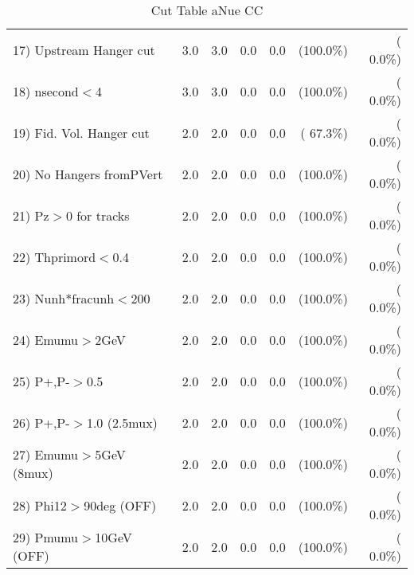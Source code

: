 \begin{table}[h!]
\begin{tabular}{||l||r|r|r|r|r|r||}
 17) Upstream Hanger cut  &          3.0 &          3.0 &          0.0 &          0.0 & (100.0\%) & (  0.0\%) \\
 18) nsecond$<$4          &          3.0 &          3.0 &          0.0 &          0.0 & (100.0\%) & (  0.0\%) \\
 19) Fid. Vol. Hanger cut &          2.0 &          2.0 &          0.0 &          0.0 & ( 67.3\%) & (  0.0\%) \\
 20) No Hangers fromPVert &          2.0 &          2.0 &          0.0 &          0.0 & (100.0\%) & (  0.0\%) \\
 21) Pz$>$0 for tracks    &          2.0 &          2.0 &          0.0 &          0.0 & (100.0\%) & (  0.0\%) \\
 22) Thprimord$<$0.4      &          2.0 &          2.0 &          0.0 &          0.0 & (100.0\%) & (  0.0\%) \\
 23) Nunh*fracunh$<$200   &          2.0 &          2.0 &          0.0 &          0.0 & (100.0\%) & (  0.0\%) \\
 24) Emumu$>$2GeV         &          2.0 &          2.0 &          0.0 &          0.0 & (100.0\%) & (  0.0\%) \\
 25) P+,P-$>$0.5          &          2.0 &          2.0 &          0.0 &          0.0 & (100.0\%) & (  0.0\%) \\
 26) P+,P-$>$1.0 (2.5mux) &          2.0 &          2.0 &          0.0 &          0.0 & (100.0\%) & (  0.0\%) \\
 27) Emumu$>$5GeV  (8mux) &          2.0 &          2.0 &          0.0 &          0.0 & (100.0\%) & (  0.0\%) \\
 28) Phi12$>$90deg  (OFF) &          2.0 &          2.0 &          0.0 &          0.0 & (100.0\%) & (  0.0\%) \\
 29) Pmumu$>$10GeV  (OFF) &          2.0 &          2.0 &          0.0 &          0.0 & (100.0\%) & (  0.0\%) \\
 \hline
 \hline
 \end{tabular}
 \caption{Cut Table  aNue CC  }
 \label{tab-cutcohjpsi-mumu_anuecc}
 \end{table}
